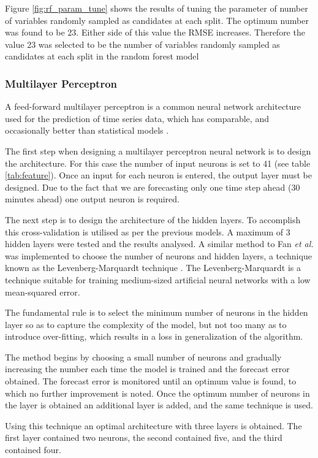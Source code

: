 Figure \ref{fig:rf_param_tune} shows the results of tuning the parameter of number of variables randomly sampled as candidates at each split. The optimum number was found to be 23. Either side of this value the RMSE increases. Therefore the value 23 was selected to be the number of variables randomly sampled as candidates at each split in the random forest model


\subsubsection{Multilayer Perceptron}

A feed-forward multilayer perceptron is a common neural network architecture used for the prediction of time series data, which has comparable, and occasionally better than statistical models \cite{Hill1994}. 

The first step when designing a multilayer perceptron neural network is to design the architecture. For this case the number of input neurons is set to 41 (see table \ref{tab:feature}). Once an input for each neuron is entered, the output layer must be designed. Due to the fact that we are forecasting only one time step ahead (30 minutes ahead) one output neuron is required.

The next step is to design the architecture of the hidden layers. To accomplish this cross-validation is utilised as per the previous models. A maximum of 3 hidden layers were tested and the results analysed. A similar method to Fan \textit{et al.} was implemented to choose the number of neurons and hidden layers, a technique known as the Levenberg-Marquardt technique \cite{Fan2009}. The Levenberg-Marquardt is a technique suitable for training medium-sized artificial neural networks with a low mean-squared error. 

The fundamental rule is to select the minimum number of neurons in the hidden layer so as to capture the complexity of the model, but not too many as to introduce over-fitting, which results in a loss in generalization of the algorithm.

The method begins by choosing a small number of neurons and gradually increasing the number each time the model is trained and the forecast error obtained. The forecast error is monitored until an optimum value is found, to which no further improvement is noted. Once the optimum number of neurons in the layer is obtained an additional layer is added, and the same technique is used.

Using this technique an optimal architecture with three layers is obtained. The first layer contained two neurons, the second contained five, and the third contained four.



